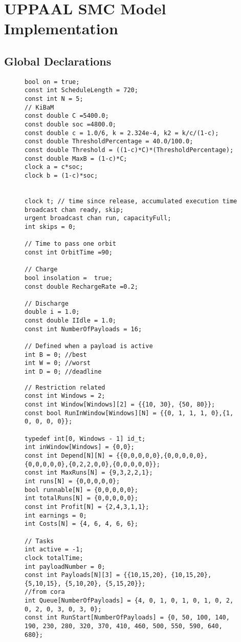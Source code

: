 \chapter{UPPAAL SMC Model Implementation}\label{appendix:smc_models}
\section{Global Declarations}
\begin{figure}[H]
\begin{lstlisting}[language=my_c, caption={Global declarations}, label=lst:global_declarations_code0]
bool on = true;
const int ScheduleLength = 720;
const int N = 5;
// KiBaM
const double C =5400.0;
const double soc =4800.0;
const double c = 1.0/6, k = 2.324e-4, k2 = k/c/(1-c);
const double ThresholdPercentage = 40.0/100.0;
const double Threshold = ((1-c)*C)*(ThresholdPercentage);
const double MaxB = (1-c)*C;
clock a = c*soc;
clock b = (1-c)*soc;


clock t; // time since release, accumulated execution time
broadcast chan ready, skip; 
urgent broadcast chan run, capacityFull;
int skips = 0;

// Time to pass one orbit
const int OrbitTime =90;

// Charge
bool insolation =  true;
const double RechargeRate =0.2;

// Discharge
double i = 1.0;
const double IIdle = 1.0;
const int NumberOfPayloads = 16;

// Defined when a payload is active
int B = 0; //best
int W = 0; //worst
int D = 0; //deadline
\end{lstlisting}
\end{figure}
\begin{figure}[H]
\begin{lstlisting}[language=my_c, caption={Global declarations}, label=lst:global_declarations_code1, firstnumber=35]
// Restriction related
const int Windows = 2;
const int Window[Windows][2] = {{10, 30}, {50, 80}};
const bool RunInWindow[Windows][N] = {{0, 1, 1, 1, 0},{1, 0, 0, 0, 0}};

typedef int[0, Windows - 1] id_t;
int inWindow[Windows] = {0,0};
const int Depend[N][N] = {{0,0,0,0,0},{0,0,0,0,0},{0,0,0,0,0},{0,2,2,0,0},{0,0,0,0,0}};
const int MaxRuns[N] = {9,3,2,2,1};
int runs[N] = {0,0,0,0,0};
bool runnable[N] = {0,0,0,0,0};
int totalRuns[N] = {0,0,0,0,0};
const int Profit[N] = {2,4,3,1,1}; 
int earnings = 0;
int Costs[N] = {4, 6, 4, 6, 6};

// Tasks
int active = -1;
clock totalTime;
int payloadNumber = 0;
const int Payloads[N][3] = {{10,15,20}, {10,15,20}, {5,10,15}, {5,10,20}, {5,15,20}};
//from cora
int Queue[NumberOfPayloads] = {4, 0, 1, 0, 1, 0, 1, 0, 2, 0, 2, 0, 3, 0, 3, 0};
const int RunStart[NumberOfPayloads] = {0, 50, 100, 140, 190, 230, 280, 320, 370, 410, 460, 500, 550, 590, 640, 680};
\end{lstlisting}
\end{figure}
